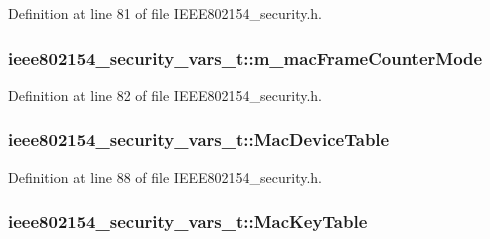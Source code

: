 Definition at line 81 of file I\+E\+E\+E802154\+\_\+security.\+h.

\subsubsection[{\texorpdfstring{m\+\_\+mac\+Frame\+Counter\+Mode}{m_macFrameCounterMode}}]{ ieee802154\+\_\+security\+\_\+vars\+\_\+t\+::m\+\_\+mac\+Frame\+Counter\+Mode}\hypertarget{structieee802154__security__vars__t_a2ce81e87e039fa75cb54a21c64dd7cd5}{}\label{structieee802154__security__vars__t_a2ce81e87e039fa75cb54a21c64dd7cd5}


Definition at line 82 of file I\+E\+E\+E802154\+\_\+security.\+h.

\subsubsection[{\texorpdfstring{Mac\+Device\+Table}{MacDeviceTable}}]{ ieee802154\+\_\+security\+\_\+vars\+\_\+t\+::\+Mac\+Device\+Table}\hypertarget{structieee802154__security__vars__t_ad758c7fe1ee093f110d065654014faca}{}\label{structieee802154__security__vars__t_ad758c7fe1ee093f110d065654014faca}


Definition at line 88 of file I\+E\+E\+E802154\+\_\+security.\+h.

\subsubsection[{\texorpdfstring{Mac\+Key\+Table}{MacKeyTable}}]{ ieee802154\+\_\+security\+\_\+vars\+\_\+t\+::\+Mac\+Key\+Table}\hypertarget{structieee802154__security__vars__t_a302a3ae85313be8000b212803cba827c}{}\label{structieee802154__security__vars__t_a302a3ae85313be8000b212803cba827c}


